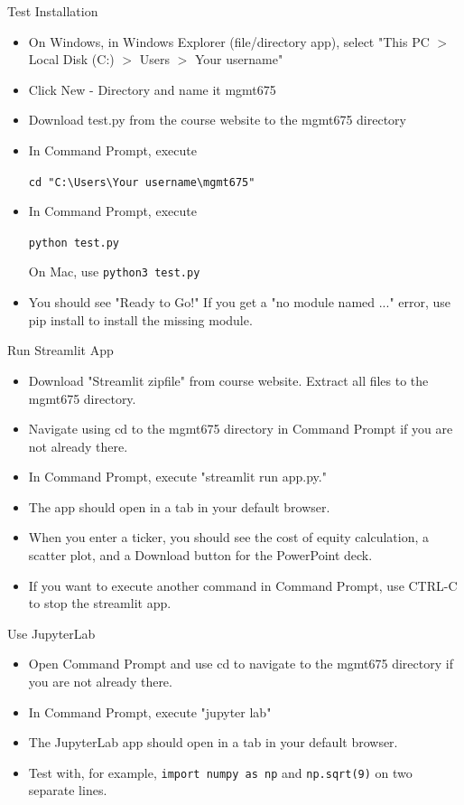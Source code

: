 \documentclass[10pt]{beamer}
\begin{document}
\begin{frame}{Test Installation}
\begin{itemize}
    \item On Windows, in Windows Explorer (file/directory app), select "This PC $>$ Local Disk (C:) $>$ Users $>$ Your username"
    \item Click New - Directory and name it mgmt675 
    \item Download test.py from the course website to the mgmt675 directory
    \item In Command Prompt, execute 
  
    \texttt{cd "C:\textbackslash Users\textbackslash Your username\textbackslash mgmt675" }

    \item In Command Prompt, execute 
   
    \texttt{python test.py}

  On Mac, use \texttt{python3 test.py}
    \item You should see "Ready to Go!"  If you get a "no module named ..." error, use pip install to install the missing module.
    \end{itemize}
\end{frame}

\begin{frame}{Run Streamlit App}
\begin{itemize}
    \item Download "Streamlit zipfile" from course website.  Extract all files to the mgmt675 directory.
    \item Navigate using cd to the mgmt675 directory in Command Prompt if you are not already there.
    \item In Command Prompt, execute "streamlit run app.py."
    \item The app should open in a tab in your default browser.
    \item When you enter a ticker, you should see the cost of equity calculation, a scatter plot, and a Download button for the PowerPoint deck.
    \item If you want to execute another command in Command Prompt, use CTRL-C to stop the streamlit app.
\end{itemize}
\end{frame}

\begin{frame}{Use JupyterLab}
    \begin{itemize}
    \item Open Command Prompt and use cd to navigate to the mgmt675 directory if you are not already there.
    \item In Command Prompt, execute "jupyter lab"
    \item The JupyterLab app should open in a tab in your default browser.
    \item Test with, for example, \texttt{import numpy as np} and \texttt{np.sqrt(9)} on two separate lines.
    \end{itemize}
\end{frame}
\end{document}

